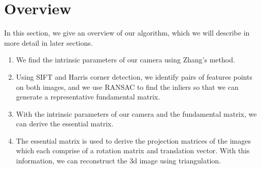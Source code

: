 \section{Overview}
\label{s:overview}

In this section, we give an overview of our algorithm, which we will describe in more detail
in later sections.

\begin{enumerate}
\item{We find the intrinsic parameters of our camera using Zhang's method.}
\item{Using SIFT and Harris corner detection, we identify pairs of features points on both images, and we use RANSAC to find the inliers so that we can generate a representative fundamental matrix.}
\item{With the intrinsic parameters of our camera and the fundamental matrix, we can derive the essential matrix.}
\item{The essential matrix is used to derive the projection matrices of the images which each comprise of a rotation matrix and translation vector. With this information, we can reconstruct the 3d image using triangulation.}
\end{enumerate}
